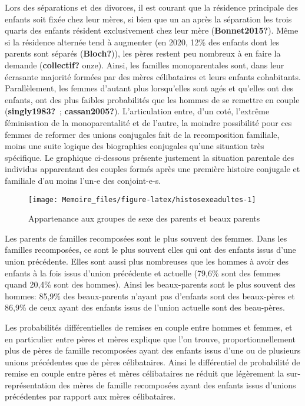 \documentclass[
  12pt,
]{book}
\begin{document}
Lors des séparations et des divorces, il est courant que la résidence
principale des enfants soit fixée chez leur mères, si bien que un an
après la séparation les trois quarts des enfants résident exclusivement
chez leur mère (\textbf{Bonnet2015?}). Même si la résidence alternée
tend à augmenter (en 2020, 12\% des enfants dont les parents sont
séparés (\textbf{Bloch?})), les pères restent peu nombreux à en faire la
demande (\textbf{collectif?} onze). Ainsi, les familles monoparentales
sont, dans leur écrasante majorité formées par des mères célibataires et
leurs enfants cohabitants. Parallèlement, les femmes d'autant plus
lorsqu'elles sont agés et qu'elles ont des enfants, ont des plus faibles
probabilités que les hommes de se remettre en couple
(\textbf{singly1983?}~; \textbf{cassan2005?}). L'articulation entre,
d'un coté, l'extrême féminisation de la monoparentalité et de l'autre,
la moindre possibilité pour ces femmes de reformer des unions conjugales
fait de la recomposition familiale, moins une suite logique des
biographies conjugales qu'une situation très spécifique. Le graphique
ci-dessous présente justement la situation parentale des individus
apparentant des couples formés après une première histoire conjugale et
familiale d'au moins l'un-e des conjoint-e-s.

\begin{figure}[h]

{\centering \texttt{[image: Memoire\_files/figure-latex/histosexeadultes-1]} 

}

\caption{Appartenance aux groupes de sexe des parents et beaux parents}\label{fig:histosexeadultes}
\end{figure}

Les parents de familles recomposées sont le plus souvent des femmes.
Dans les familles recomposées, ce sont le plus souvent elles qui ont des
enfants issus d'une union précédente. Elles sont aussi plus nombreuses
que les hommes à avoir des enfants à la fois issus d'union précédente et
actuelle (79,6\% sont des femmes quand 20,4\% sont des hommes). Ainsi
les beaux-parents sont le plus souvent des hommes: 85,9\% des
beaux-parents n'ayant pas d'enfants sont des beaux-pères et 86,9\% de
ceux ayant des enfants issus de l'union actuelle sont des beau-pères.

Les probabilités différentielles de remises en couple entre hommes et
femmes, et en particulier entre pères et mères explique que l'on trouve,
proportionnellement plus de pères de famille recomposées ayant des
enfants issus d'une ou de plusieurs unions précédentes que de pères
célibataires. Ainsi le différentiel de probabilité de remise en couple
entre pères et mères célibataires ne réduit que légèrement la
sur-représentation des mères de famille recomposées ayant des enfants
issus d'unions précédentes par rapport aux mères célibataires.
\end{document}
